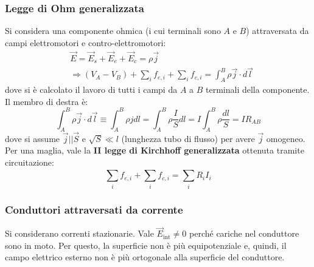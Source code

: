 \documentclass[10pt, a4paper]{scrartcl}
\numberwithin{equation}{subsection}
\theoremstyle{style1}
\begin{document}
\subsubsection{Legge di Ohm generalizzata}

Si considera una componente ohmica (i cui terminali sono $A$ e $B$) attraversata da campi elettromotori e contro-elettromotori:
\begin{equation}
	\begin{split}
		&\vec{E} = \vec{E}_s + \vec{E}_e + \vec{E}_c = \rho \vec{j}\\
		&\Rightarrow (V_A - V_B) + \sum_{i}^{} f_{e,i} + \sum_{i}^{} f_{c,i} = \int_{A} ^B \rho \vec{j}\cdot d\vec{l} 
	\end{split}
\end{equation}
dove si \`e calcolato il lavoro di tutti i campi da $A$ a $B$ terminali della componente. Il membro di destra \`e:
\begin{equation}
	\int_{A} ^B \rho \vec{j}\cdot d\vec{l} \equiv \int_{A} ^B \rho  j dl = \int_{A} ^B \rho  \frac{I}{S} dl = I \int_{A} ^B \rho  \frac{dl}{S} = I R_{AB} 
\end{equation}
dove si assume $\vec{j}| | \vec{S}$ e $\sqrt{S} \ll l$ (lunghezza tubo di flusso) per avere $\vec{j}$ omogeneo. Per una maglia, vale la \textbf{II legge di Kirchhoff generalizzata} ottenuta tramite circuitazione:
\begin{equation}
\sum_{i}^{} f_{e,i} + \sum_{i}^{} f_{c,i} = \sum_{i}^{} R_i I_i
\end{equation}
\subsubsection{Conduttori attraversati da corrente}

Si considerano correnti stazionarie. Vale $\vec{E}_\text{int}\neq 0$ perch\'e cariche nel conduttore sono in moto. Per questo, la superficie non \`e pi\`u equipotenziale e, quindi, il campo elettrico esterno non \`e pi\`u ortogonale alla superficie del conduttore.
\end{document}
